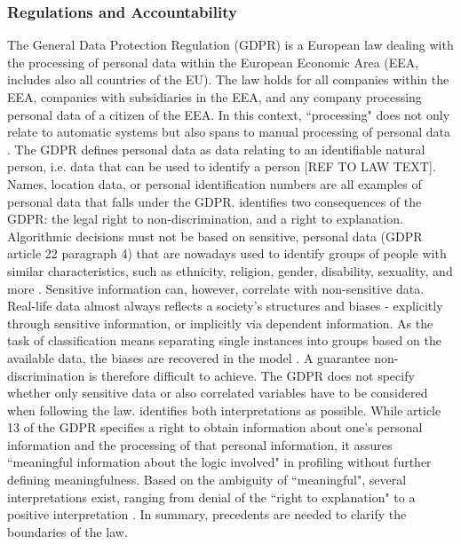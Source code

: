 \subsubsection{Regulations and Accountability}
The General Data Protection Regulation (GDPR) is a European law dealing with the processing of personal data within the European Economic Area (EEA, includes also all countries of the EU). The law holds for all companies within the EEA, companies with subsidiaries in the EEA, and any company processing personal data of a citizen of the EEA. In this context, ``processing" does not only relate to automatic systems but also spans to manual processing of personal data \cite{goodman16eu}. The GDPR defines personal data as data relating to an identifiable natural person, i.e. data that can be used to identify a person {\color{red}[REF TO LAW TEXT]}. Names, location data, or personal identification numbers are all examples of personal data that falls under the GDPR. \cite{goodman16eu} identifies two consequences of the GDPR: the legal right to non-discrimination, and a right to explanation.\newline
Algorithmic decisions must not be based on sensitive, personal data (GDPR article 22 paragraph 4) that are nowadays used to identify groups of people with similar characteristics, such as ethnicity, religion, gender, disability, sexuality, and more \cite{diakopoulos2016accountability}. Sensitive information can, however, correlate with non-sensitive data. Real-life data almost always reflects a society's structures and biases - explicitly through sensitive information, or implicitly via dependent information. As the task of classification means separating single instances into groups based on the available data, the biases are recovered in the model \cite{goodman16eu}. A guarantee non-discrimination is therefore difficult to achieve. The GDPR does not specify whether only sensitive data or also correlated variables have to be considered when following the law. \cite{goodman16eu} identifies both interpretations as possible.\newline
While article 13 of the GDPR specifies a right to obtain information about one's personal information and the processing of that personal information, it assures ``meaningful information about the logic involved" in profiling without further defining meaningfulness. Based on the ambiguity of ``meaningful", several interpretations exist, ranging from denial of the ``right to explanation" \cite{wachter2017right} to a positive interpretation \cite{selbst2017meaningful}. In summary, precedents are needed to clarify the boundaries of the law.\newline

